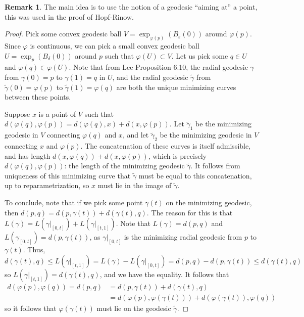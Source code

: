 \documentclass[aps,pra,showpacs,notitlepage,onecolumn,superscriptaddress,nofootinbib]{revtex4-1}
\theoremstyle{definition}
\newtheorem{remark}{Remark}[section]
\begin{document}
\begin{remark}
  The main idea is to use the notion of a geodesic ``aiming at'' a point, this was used in the proof of Hopf-Rinow.
  \end{remark}

\begin{proof}
  Pick some convex geodesic ball $V = \exp_{\varphi(p)}(B_{\varepsilon}(0))$ around $\varphi(p)$. Since $\varphi$ is continuous, we can pick a small convex geodesic ball $U = \exp_{p}(B_{\delta}(0))$ around
  $p$ such that $\varphi(U) \subset V$. Let us pick some $q \in U$ and $\varphi(q) \in \varphi(U)$. Note that from Lee Proposition 6.10, the radial geodesic $\gamma$ from $\gamma(0) = p$ to $\gamma(1) = q$ in $U$,
  and the radial geodesic $\widetilde{\gamma}$ from $\widetilde{\gamma}(0) = \varphi(p)$ to $\widetilde{\gamma}(1) = \varphi(q)$ are both the unique minimizing curves between these points.
  \newline

  \noindent Suppose $x$ is a point of $V$ such that $d(\varphi(q), \varphi(p)) = d(\varphi(q), x) + d(x, \varphi(p))$. Let $\widetilde{\gamma}_1$ be the minimizing geodesic in $V$ connecting $\varphi(q)$
  and $x$, and let $\widetilde{\gamma}_2$ be the minimizing geodesic in $V$ connecting $x$ and $\varphi(p)$. The concatenation of these curves is itself admissible, and has length $d(x, \varphi(q)) + d(x, \varphi(p))$,
  which is precisely $d(\varphi(q), \varphi(p))$: the length of the minimizing geodesic $\widetilde{\gamma}$. It follows from uniqueness of this minimizing curve that $\widetilde{\gamma}$ must be equal to
  this concatenation, up to reparametrization, so $x$ must lie in the image of $\widetilde{\gamma}$.
  \newline

  \noindent To conclude, note that if we pick some point $\gamma(t)$ on the minimizing geodesic, then $d(p, q) = d(p, \gamma(t)) + d(\gamma(t), q)$. The reason for this is that $L(\gamma) = L(\gamma|_{[0, t]}) + L(\gamma|_{[t, 1]})$.
  Note that $L(\gamma) = d(p, q)$ and $L(\gamma_{[0, t]}) = d(p, \gamma(t))$, as $\gamma|_{[0, t]}$ is the minimizing radial geodesic from $p$ to $\gamma(t)$. Thus,
  \begin{equation}
    d(\gamma(t), q) \leq L(\gamma|_{[t, 1]}) = L(\gamma) - L(\gamma|_{[0, t]}) = d(p, q) - d(p, \gamma(t)) \leq d(\gamma(t), q)
  \end{equation}
  so $L(\gamma|_{[t, 1]}) = d(\gamma(t), q)$, and we have the equality. It follows that
  \begin{align}
    d(\varphi(p), \varphi(q)) = d(p, q) &= d(p, \gamma(t)) + d(\gamma(t), q)
    \\ &= d(\varphi(p), \varphi(\gamma(t)) ) + d(\varphi(\gamma(t)), \varphi(q))
  \end{align}
  so it follows that $\varphi(\gamma(t))$ must lie on the geodesic $\widetilde{\gamma}$.
  \newline


\end{proof}
\end{document}
